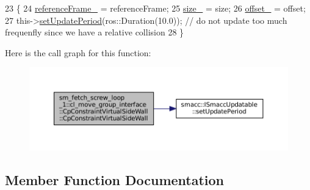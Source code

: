 \begin{DoxyCode}
23         \{
24             \hyperlink{classsm__fetch__screw__loop__1_1_1cl__move__group__interface_1_1CpConstraintVirtualSideWall_af0f1ec5b78685c0c4a45906aca85219e}{referenceFrame\_} = referenceFrame;
25             \hyperlink{classsm__fetch__screw__loop__1_1_1cl__move__group__interface_1_1CpConstraintVirtualSideWall_ab495461dac422e249302ec9be8e9e17a}{size\_} = size;
26             \hyperlink{classsm__fetch__screw__loop__1_1_1cl__move__group__interface_1_1CpConstraintVirtualSideWall_a2bb600f30ac245821b733051f67ff1f5}{offset\_} = offset;
27             this->\hyperlink{classsmacc_1_1ISmaccUpdatable_a88f3b092a81b2d8810a9776c8c69855b}{setUpdatePeriod}(ros::Duration(10.0)); \textcolor{comment}{// do not update too much frequenfly
       since we have a relative collision}
28         \}
\end{DoxyCode}
Here is the call graph for this function\+:
\nopagebreak
\begin{figure}[H]
\begin{center}
\leavevmode
\includegraphics[width=350pt]{classsm__fetch__screw__loop__1_1_1cl__move__group__interface_1_1CpConstraintVirtualSideWall_a418294a1483bec4949879e1a28e20144_cgraph}
\end{center}
\end{figure}


\subsection{Member Function Documentation}
\mbox{\label{classsm__fetch__screw__loop__1_1_1cl__move__group__interface_1_1CpConstraintVirtualSideWall_a57a9d6a1149ded198943c69fedc567fc}} 
